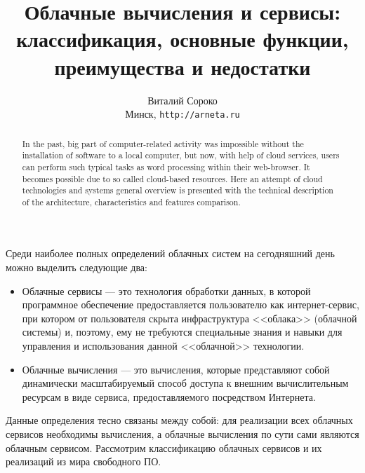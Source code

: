 \documentclass[a5paper,10pt]{article}
\begin{document}
\title{Облачные вычисления и сервисы: классификация, основные функции, преимущества и недостатки}

\author{Виталий Сороко\\ 
\small Минск, \texttt{http://arneta.ru}
}
\maketitle
\begin{abstract}
In the past, big part of computer-related activity was impossible without the installation of software to a local computer, but now, with help of cloud services, users can perform such typical tasks as word processing within their web-browser. It becomes possible due to so called cloud-based resources. Here an attempt of  cloud technologies and systems general overview is presented with the technical description of the architecture, characteristics and features comparison. 
\end{abstract}

Среди наиболее полных определений облачных систем на сегодняшний день можно выделить следующие два:
\begin{itemize}
\item Облачные сервисы --- это технология обработки данных, в которой программное обеспечение предоставляется пользователю как интернет-сервис, при котором от пользователя скрыта инфраструктура <<облака>> (облачной системы) и, поэтому, ему не требуются специальные знания и навыки для  управления и использования данной <<облачной>> технологии.
\item Облачные вычисления --- это вычисления, которые представляют собой динамически масштабируемый способ доступа к внешним вычислительным ресурсам в виде сервиса, предоставляемого посредством Интернета.
\end{itemize}

Данные определения тесно связаны между собой: для реализации всех облачных сервисов необходимы вычисления, а облачные вычисления по сути сами являются облачным сервисом. Рассмотрим классификацию облачных сервисов и их реализаций из мира свободного ПО.
\end{document}
